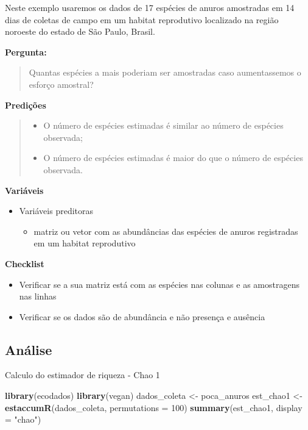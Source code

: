 \documentclass[
]{book}
\newenvironment{Shaded}{\begin{snugshade}}{\end{snugshade}}
\newcommand{\DataTypeTok}[1]{\textcolor[rgb]{0.13,0.29,0.53}{#1}}
\newcommand{\DecValTok}[1]{\textcolor[rgb]{0.00,0.00,0.81}{#1}}
\newcommand{\KeywordTok}[1]{\textcolor[rgb]{0.13,0.29,0.53}{\textbf{#1}}}
\newcommand{\NormalTok}[1]{#1}
\newcommand{\StringTok}[1]{\textcolor[rgb]{0.31,0.60,0.02}{#1}}
\providecommand{\tightlist}{%
  \setlength{\itemsep}{0pt}\setlength{\parskip}{0pt}}
\begin{document}
Neste exemplo usaremos os dados de 17 espécies de anuros amostradas em 14 dias de coletas de campo em um habitat reprodutivo localizado na região noroeste do estado de São Paulo, Brasil.

\textbf{Pergunta:}

\begin{quote}
Quantas espécies a mais poderiam ser amostradas caso aumentassemos o esforço amostral?
\end{quote}

\textbf{Predições}

\begin{quote}
\begin{itemize}
\tightlist
\item
  O número de espécies estimadas é similar ao número de espécies observada;
\item
  O número de espécies estimadas é maior do que o número de espécies observada.
\end{itemize}
\end{quote}

\textbf{Variáveis}

\begin{itemize}
\tightlist
\item
  Variáveis preditoras

  \begin{itemize}
  \tightlist
  \item
    matriz ou vetor com as abundâncias das espécies de anuros registradas em um habitat reprodutivo
  \end{itemize}
\end{itemize}

\textbf{Checklist}

\begin{itemize}
\tightlist
\item
  Verificar se a sua matriz está com as espécies nas colunas e as amostragens nas linhas
\item
  Verificar se os dados são de abundância e não presença e ausência
\end{itemize}

\hypertarget{anuxe1lise}{%
\subsection{Análise}\label{anuxe1lise}}

Calculo do estimador de riqueza - Chao 1

\begin{Shaded}
\begin{Highlighting}[]
\KeywordTok{library}\NormalTok{(ecodados)}
\KeywordTok{library}\NormalTok{(vegan)}
\NormalTok{dados_coleta <-}\StringTok{ }\NormalTok{poca_anuros}
\NormalTok{est_chao1 <-}\StringTok{ }\KeywordTok{estaccumR}\NormalTok{(dados_coleta, }\DataTypeTok{permutations =} \DecValTok{100}\NormalTok{)}
\KeywordTok{summary}\NormalTok{(est_chao1, }\DataTypeTok{display =} \StringTok{"chao"}\NormalTok{)}
\end{Highlighting}
\end{Shaded}
\end{document}
